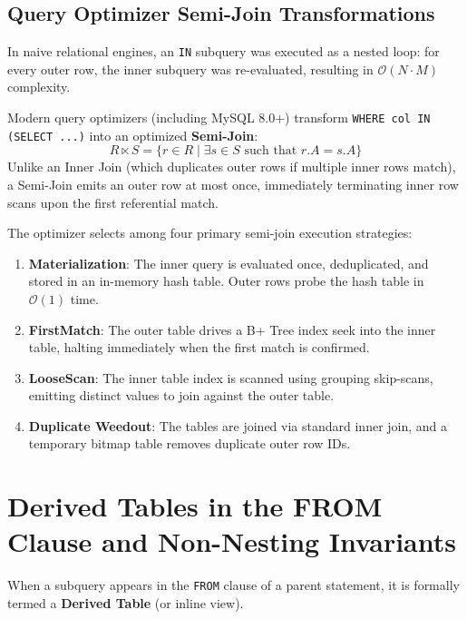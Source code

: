 \documentclass[10pt,twocolumn,letterpaper]{article}
\begin{document}
\subsection{Query Optimizer Semi-Join Transformations}
In naive relational engines, an \texttt{IN} subquery was executed as a nested loop: for every outer row, the inner subquery was re-evaluated, resulting in $\mathcal{O}(N \cdot M)$ complexity.

Modern query optimizers (including MySQL 8.0+) transform \texttt{WHERE col IN (SELECT ...)} into an optimized \textbf{Semi-Join}:
\begin{equation}
R \ltimes S = \{ r \in R \mid \exists s \in S \text{ such that } r.A = s.A \}
\end{equation}
Unlike an Inner Join (which duplicates outer rows if multiple inner rows match), a Semi-Join emits an outer row at most once, immediately terminating inner row scans upon the first referential match.

The optimizer selects among four primary semi-join execution strategies:
\begin{enumerate}
    \item \textbf{Materialization}: The inner query is evaluated once, deduplicated, and stored in an in-memory hash table. Outer rows probe the hash table in $\mathcal{O}(1)$ time.
    \item \textbf{FirstMatch}: The outer table drives a B+ Tree index seek into the inner table, halting immediately when the first match is confirmed.
    \item \textbf{LooseScan}: The inner table index is scanned using grouping skip-scans, emitting distinct values to join against the outer table.
    \item \textbf{Duplicate Weedout}: The tables are joined via standard inner join, and a temporary bitmap table removes duplicate outer row IDs.
\end{enumerate}

\section{Derived Tables in the FROM Clause and Non-Nesting Invariants}
\label{sec:derived_tables}

When a subquery appears in the \texttt{FROM} clause of a parent statement, it is formally termed a \textbf{Derived Table} (or inline view).
\end{document}
